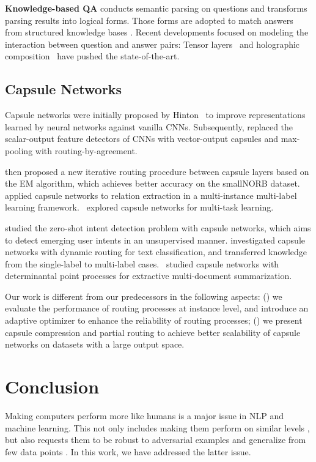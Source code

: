 \documentclass[11pt,a4paper]{article}
\newcommand{\1}{\boldsymbol{1}}
\begin{document}
\textbf{Knowledge-based QA} conducts semantic parsing on questions and transforms parsing results into logical forms.
Those forms are adopted to match answers from structured knowledge bases 
\cite{yao2014information,yih2015semantic,bordes2015large,yin2016simple,hao2017end}. Recent developments focused on modeling 
the interaction between question and answer pairs: Tensor layers~\cite{qiu2015convolutional,wan2016deep} and holographic composition~\cite{tay2017learning} have pushed the state-of-the-art.



\subsection{Capsule Networks}
Capsule networks were initially proposed by Hinton~\cite{hinton2011transforming} to improve representations learned by neural networks against vanilla CNNs. Subsequently, \citet{sabour2017dynamic} replaced the scalar-output feature detectors of CNNs with vector-output capsules and max-pooling with routing-by-agreement.

\citet{hinton2018matrix} then proposed a new iterative routing procedure between capsule layers based on the EM algorithm, which achieves better accuracy on the smallNORB dataset. 
\citet{zhang2018attention} applied capsule networks to relation extraction in a multi-instance multi-label learning framework.~\citet{xiao2018mcapsnet} explored capsule networks for multi-task learning.

\citet{xia2018zero} studied the zero-shot intent detection problem with capsule networks, which aims to detect emerging user intents in an unsupervised manner.
\citet{zhao2018investigating} investigated capsule networks with dynamic routing for text classification, and transferred knowledge from the single-label to multi-label cases.~\citet{Cho:2019} studied capsule networks with determinantal point processes for extractive multi-document summarization.

Our work is different from our predecessors in the following aspects: () we evaluate the performance of routing processes at instance level, and introduce an adaptive optimizer to enhance the reliability of routing processes; 
() we present capsule compression and partial routing to achieve better scalability of capsule networks on datasets with a large output space.

\section{Conclusion}\label{sec:conclusion}
Making computers perform more like humans is a major issue in NLP and machine learning. This not only includes making them perform on similar levels \cite{Hassan:2018}, but also requests them 
to be robust to adversarial examples \cite{Eger:2019} and generalize from few data points \cite{Rueckle:2019}. In this work, we have addressed the latter issue.  
\end{document}

